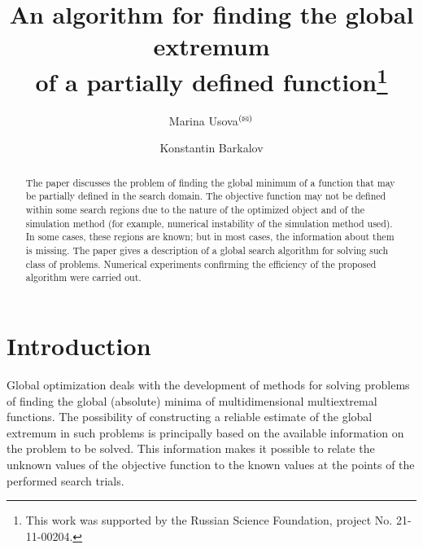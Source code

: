 \documentclass[runningheads]{llncs}
\def\letter{$^{\textrm{(\Letter)}}$}
\begin{document}
%
\title{An algorithm for finding the global extremum\\ 
of a partially defined function\thanks{This work was supported by the Russian Science Foundation, project No. 21-11-00204.}}
%
%
\author{Marina Usova\letter{} \and
Konstantin Barkalov}
%
%
%
\maketitle              %
%
\begin{abstract}
The paper discusses the problem of finding the global minimum of a function that may be partially defined in the search domain. The objective function may not be defined within some search regions due to the nature of the optimized object and of the simulation method (for example, numerical instability of the simulation method used). In some cases, these regions are known; but in most cases, the information about them is missing. The paper gives a description of a global search algorithm for solving such class of problems. Numerical experiments confirming the efficiency of the proposed algorithm were carried out.

\end{abstract}
%
%
%
\section{Introduction}

Global optimization deals with the development of methods for solving problems of finding the global (absolute) minima of multidimensional multiextremal functions. The possibility of constructing a reliable estimate of the global extremum in such problems is principally based on the available information on the problem to be solved. This information makes it possible to relate the unknown values of the objective function to the known values at the points of the performed search trials.
\end{document}
